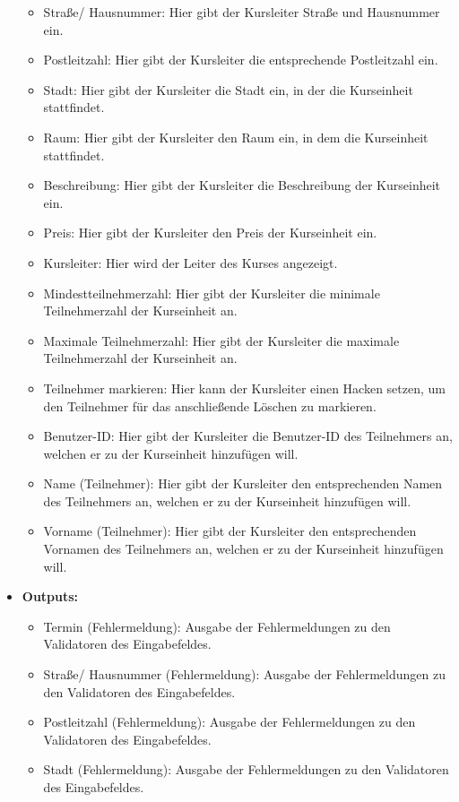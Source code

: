 \begin{itemize}
\begin{itemize}
								\item Straße/ Hausnummer: Hier gibt der Kursleiter Straße und Hausnummer ein.
								\item Postleitzahl: Hier gibt der Kursleiter die entsprechende Postleitzahl ein.
								\item Stadt: Hier gibt der Kursleiter die Stadt ein, in der die Kurseinheit stattfindet.
								\item Raum: Hier gibt der Kursleiter den Raum ein, in dem die Kurseinheit stattfindet.
								\item Beschreibung: Hier gibt der Kursleiter die Beschreibung der Kurseinheit ein.
								\item Preis: Hier gibt der Kursleiter den Preis der Kurseinheit ein.
								\item Kursleiter: Hier wird der Leiter des Kurses angezeigt.
								\item Mindestteilnehmerzahl: Hier gibt der Kursleiter die minimale Teilnehmerzahl der Kurseinheit an.
								\item Maximale Teilnehmerzahl: Hier gibt der Kursleiter die maximale Teilnehmerzahl der Kurseinheit an.
								\item Teilnehmer markieren: Hier kann der Kursleiter einen Hacken setzen, um den Teilnehmer für das anschließende Löschen zu markieren.
								\item Benutzer-ID: Hier gibt der Kursleiter die Benutzer-ID des Teilnehmers an, welchen er zu der Kurseinheit hinzufügen will.
								\item Name (Teilnehmer): Hier gibt der Kursleiter den entsprechenden Namen des Teilnehmers an, welchen er zu der Kurseinheit hinzufügen will.
								\item Vorname (Teilnehmer): Hier gibt der Kursleiter den entsprechenden Vornamen des Teilnehmers an, welchen er zu der Kurseinheit hinzufügen will.
							\end{itemize}
						\item \textbf{Outputs:}
							\begin{itemize}
								\item Termin (Fehlermeldung): Ausgabe der Fehlermeldungen zu den Validatoren des Eingabefeldes.
								\item Straße/ Hausnummer (Fehlermeldung): Ausgabe der Fehlermeldungen zu den Validatoren des Eingabefeldes.
								\item Postleitzahl (Fehlermeldung): Ausgabe der Fehlermeldungen zu den Validatoren des Eingabefeldes.
								\item Stadt (Fehlermeldung): Ausgabe der Fehlermeldungen zu den Validatoren des Eingabefeldes.

\end{itemize}
\end{itemize}
